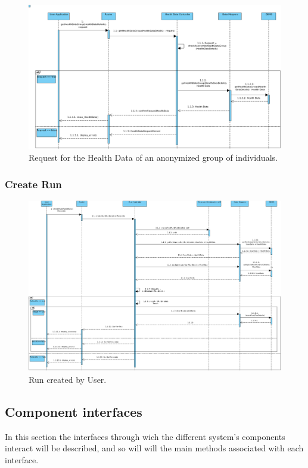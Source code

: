 \documentclass[12pt]{article}
\begin{document}
\begin{figure}[H]
    \centering
    \includegraphics[scale=0.35, angle=-90, origin=c]{getHealthDataGroup.png}
    \caption{Request for the Health Data of an anonymized group of individuals.}
    \label{fig:getHealthDataGroup}
\end{figure}


\subsubsection{Create Run}

\begin{figure}[H]
    \centering
    \includegraphics[scale=0.33, angle=-90, origin=c]{createRun.png}
    \caption{Run created by User.}
    \label{fig:createRun}
\end{figure}

\subsection{Component interfaces} 
In this section the interfaces through wich the different system's components interact will be described, and so will will the main methods associated with each interface.
\end{document}
